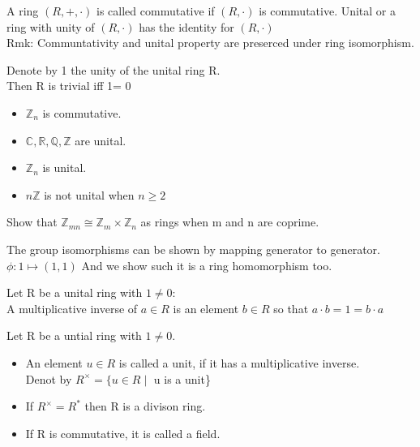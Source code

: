 \documentclass{article}
\newcommand\R{\ensuremath{\mathbb{R}}}
\newcommand\Z{\ensuremath{\mathbb{Z}}}
\newcommand\Q{\ensuremath{\mathbb{Q}}}
\newcommand\C{\ensuremath{\mathbb{C}}}
\begin{document}
\begin{Def}
    A ring $(R, +, \cdot)$ is called commutative if $(R, \cdot)$ is commutative.
    Unital or a ring with unity of $(R, \cdot)$ has the identity for $(R, \cdot)$
    \\ Rmk: Communtativity and unital property are preserced under ring isomorphism.
\end{Def}
\begin{theorem}
    Denote by 1 the unity of the unital ring R.
    \\Then R is trivial iff 1= 0
\end{theorem}

\begin{Example}
    \begin{itemize}
    \hfill 
        \item $\Z_n$ is commutative.
        \item $\C, \R, \Q, \Z $ are unital.
        \item $\Z_n$ is unital.
        \item $n\Z$ is not unital when $n\geq2$
    \end{itemize}
\end{Example}
\begin{Example}
    Show that $\Z_{mn} \cong \Z_m \times \Z_n$ as rings when m and n are coprime. 
\end{Example}
\begin{Proof}
    The group isomorphisms can be shown by mapping generator to generator. 
    $\phi: 1\mapsto (1,1)$ And we show such it is a ring homomorphism too. 
\end{Proof}

\begin{Def}
    Let R be a unital ring with $1\neq 0$:
    \\ A multiplicative inverse of $a \in R$ is an element $b \in R$ so that $a \cdot b = 1 = b \cdot a$
    
\end{Def}

\begin{Def}
    Let R be a untial ring with $1\neq0$.
    \begin{itemize}
        \item An element $u \in R$ is called a unit, if it has a multiplicative inverse. 
        \\Denot by $R^\times = \{u \in R \mid $ u is a unit\}
        \item If $R^\times = R^*$ then R is a divison ring.
        \item If R is commutative, it is called a field.
    \end{itemize}
\end{Def}
\end{document}
